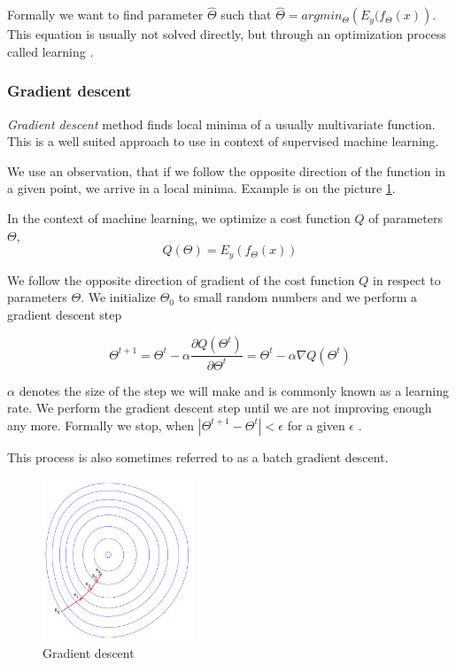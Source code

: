     Formally we want to find parameter $\hat{\Theta}$ such that $\hat{\Theta} = argmin_\Theta \left(E_y(f_\Theta(x) \right)$. 
    This equation is usually not solved directly, but through an optimization process called learning \cite{Goodfellow-et-al-2016}. %
    
    \subsubsection{Gradient descent}

    \textit{Gradient descent} method finds local minima of a usually multivariate function. 
    This is a well suited approach to use in context of supervised machine learning. 
    
    We use an observation, that if we follow the opposite direction of the function in a given point, 
    we arrive in a local minima. Example is on the picture \ref{obr:gradient}.
    
    In the context of machine learning, we optimize a cost function $Q$ of parameters $\Theta$, 
    $$Q(\Theta) = E_y(f_\Theta(x))$$
    
    We follow the opposite direction of gradient of the cost function $Q$ in respect to parameters $\Theta$. 
    We initialize $\Theta_0$ to small random numbers and we perform a gradient descent step
    
    $$\Theta^{t+1} = \Theta^t - \alpha \frac{\partial Q(\Theta^t)}{\partial \Theta^t} = \Theta^t - \alpha \nabla Q(\Theta^t)$$
    
    $\alpha$ denotes the size of the step we will make and is commonly known as a learning rate. 
    We perform the gradient descent step until we are not improving enough any more. 
    Formally we stop, when $|\Theta^{t+1} - \Theta^t| < \epsilon$ for a given $\epsilon$ \cite{bottou-bousquet-2008}.
    
    This process is also sometimes referred to as a batch gradient descent.

    \begin{figure}
    \centerline{\includegraphics[width=0.4\textwidth]{images/gradient_descent}}
    \caption[Gradient descent]{Gradient descent \cite{pict}}
    \label{obr:gradient}
    \end{figure}
    
